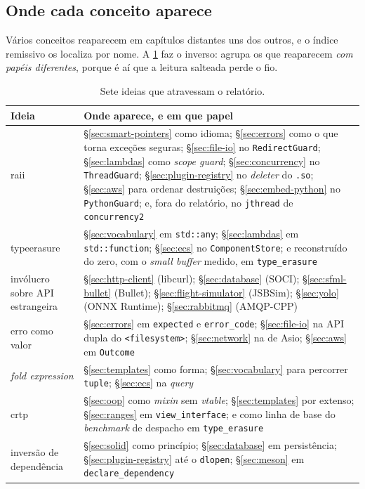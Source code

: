 \subsection{Onde cada conceito aparece}
\label{sec:mapa-conceitos}

Vários conceitos reaparecem em capítulos distantes uns dos outros, e o índice
remissivo os localiza por nome. A \cref{tab:recorrentes} faz o inverso: agrupa
os que reaparecem \emph{com papéis diferentes}, porque é aí que a leitura salteada
perde o fio.

\begin{table}[htbp]
\centering
\caption{Sete ideias que atravessam o relatório.}
\label{tab:recorrentes}
\footnotesize
\begin{tabular}{@{}lp{}@{}}
\toprule
\textbf{Ideia} & \textbf{Onde aparece, e em que papel} \\
\midrule
\gls{raii} &
    \S\ref{sec:smart-pointers} como idioma; \S\ref{sec:errors} como o que torna
    exceções seguras; \S\ref{sec:file-io} no \texttt{RedirectGuard};
    \S\ref{sec:lambdas} como \emph{scope guard}; \S\ref{sec:concurrency} no
    \texttt{ThreadGuard}; \S\ref{sec:plugin-registry} no \emph{deleter} do
    \texttt{.so}; \S\ref{sec:aws} para ordenar destruições;
    \S\ref{sec:embed-python} no \texttt{PythonGuard}; e, fora do relatório, no
    \texttt{jthread} de \texttt{concurrency2} \\[3pt]
\gls{typeerasure} &
    \S\ref{sec:vocabulary} em \texttt{std::any}; \S\ref{sec:lambdas} em
    \texttt{std::function}; \S\ref{sec:ecs} no \texttt{ComponentStore}; e
    reconstruído do zero, com o \emph{small buffer} medido, em
    \texttt{type\_erasure} \\[3pt]
invólucro sobre API estrangeira &
    \S\ref{sec:http-client} (libcurl); \S\ref{sec:database} (SOCI);
    \S\ref{sec:sfml-bullet} (Bullet); \S\ref{sec:flight-simulator} (JSBSim);
    \S\ref{sec:yolo} (ONNX Runtime); \S\ref{sec:rabbitmq} (AMQP-CPP) \\[3pt]
erro como valor &
    \S\ref{sec:errors} em \texttt{expected} e \texttt{error\_code};
    \S\ref{sec:file-io} na API dupla do \texttt{<filesystem>};
    \S\ref{sec:network} na de Asio; \S\ref{sec:aws} em \texttt{Outcome} \\[3pt]
\emph{fold expression} &
    \S\ref{sec:templates} como forma; \S\ref{sec:vocabulary} para percorrer
    \texttt{tuple}; \S\ref{sec:ecs} na \emph{query} \\[3pt]
\gls{crtp} &
    \S\ref{sec:oop} como \emph{mixin} sem \emph{vtable};
    \S\ref{sec:templates} por extenso; \S\ref{sec:ranges} em
    \texttt{view\_interface}; e como linha de base do \emph{benchmark} de
    despacho em \texttt{type\_erasure} \\[3pt]
inversão de dependência &
    \S\ref{sec:solid} como princípio; \S\ref{sec:database} em persistência;
    \S\ref{sec:plugin-registry} até o \texttt{dlopen};
    \S\ref{sec:meson} em \texttt{declare\_dependency} \\
\bottomrule
\end{tabular}
\end{table}

